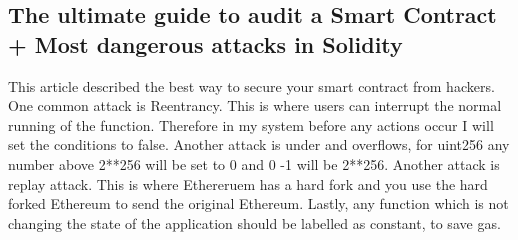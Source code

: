 \subsection*{The ultimate guide to audit a Smart Contract + Most dangerous attacks in Solidity  \cite{Grincalaitis:2017:pdflatex}}
This article described the best way to secure your smart contract from hackers. One common attack is Reentrancy. This is where users can interrupt the normal running of the function.  Therefore in my system before any actions occur I will set the conditions to false. Another attack is under and overflows, for uint256 any number above 2**256 will be set to 0 and 0 -1 will be 2**256. Another attack is replay attack. This is where Ethereruem has a hard fork and you use the hard forked Ethereum to send the original Ethereum. Lastly, any function which is not changing the state of the application should be labelled as constant, to save gas.